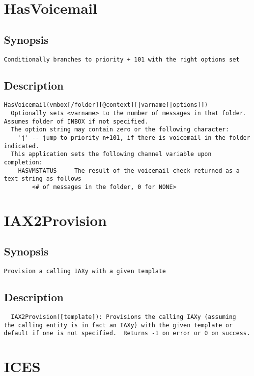 \section{HasVoicemail}
\subsection{Synopsis}
\begin{verbatim}
Conditionally branches to priority + 101 with the right options set
\end{verbatim}
\subsection{Description}
\begin{verbatim}
HasVoicemail(vmbox[/folder][@context][|varname[|options]])
  Optionally sets <varname> to the number of messages in that folder.  Assumes folder of INBOX if not specified.
  The option string may contain zero or the following character:
	'j' -- jump to priority n+101, if there is voicemail in the folder indicated.
  This application sets the following channel variable upon completion:
	HASVMSTATUS		The result of the voicemail check returned as a text string as follows
		<# of messages in the folder, 0 for NONE>

\end{verbatim}


\section{IAX2Provision}
\subsection{Synopsis}
\begin{verbatim}
Provision a calling IAXy with a given template
\end{verbatim}
\subsection{Description}
\begin{verbatim}
  IAX2Provision([template]): Provisions the calling IAXy (assuming
the calling entity is in fact an IAXy) with the given template or
default if one is not specified.  Returns -1 on error or 0 on success.

\end{verbatim}


\section{ICES}

